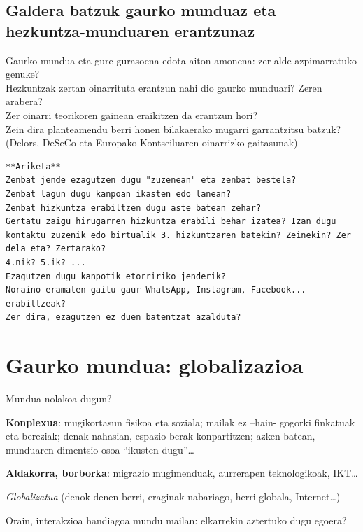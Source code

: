 \documentclass[
]{book}
\begin{document}
\hypertarget{galdera-batzuk-gaurko-munduaz-eta-hezkuntza-munduaren-erantzunaz}{%
\subsection{Galdera batzuk gaurko munduaz eta hezkuntza-munduaren erantzunaz}\label{galdera-batzuk-gaurko-munduaz-eta-hezkuntza-munduaren-erantzunaz}}

Gaurko mundua eta gure gurasoena edota aiton-amonena: zer alde azpimarratuko genuke?\\
Hezkuntzak zertan oinarrituta erantzun nahi dio gaurko munduari? Zeren arabera?\\
Zer oinarri teorikoren gainean eraikitzen da erantzun hori?\\
Zein dira planteamendu berri honen bilakaerako mugarri garrantzitsu batzuk? (Delors, DeSeCo eta Europako Kontseiluaren oinarrizko gaitasunak)

\begin{verbatim}
**Ariketa**
Zenbat jende ezagutzen dugu "zuzenean" eta zenbat bestela?
Zenbat lagun dugu kanpoan ikasten edo lanean? 
Zenbat hizkuntza erabiltzen dugu aste batean zehar? 
Gertatu zaigu hirugarren hizkuntza erabili behar izatea? Izan dugu kontaktu zuzenik edo birtualik 3. hizkuntzaren batekin? Zeinekin? Zer dela eta? Zertarako?
4.nik? 5.ik? ...
Ezagutzen dugu kanpotik etorririko jenderik? 
Noraino eramaten gaitu gaur WhatsApp, Instagram, Facebook... erabiltzeak?
Zer dira, ezagutzen ez duen batentzat azalduta?
\end{verbatim}

\hypertarget{gaurko-mundua-globalizazioa}{%
\section{Gaurko mundua: globalizazioa}\label{gaurko-mundua-globalizazioa}}

Mundua nolakoa dugun?

\textbf{Konplexua}: mugikortasun fisikoa eta soziala; mailak ez --hain- gogorki finkatuak eta bereziak; denak nahasian, espazio berak konpartitzen; azken batean, munduaren dimentsio osoa ``ikusten dugu''\ldots{}

\textbf{Aldakorra, borborka}: migrazio mugimenduak, aurrerapen teknologikoak, IKT\ldots{}

\emph{Globalizatua} (denok denen berri, eraginak nabariago, herri globala, Internet\ldots)

Orain, interakzioa handiagoa mundu mailan: elkarrekin aztertuko dugu egoera?
\end{document}
